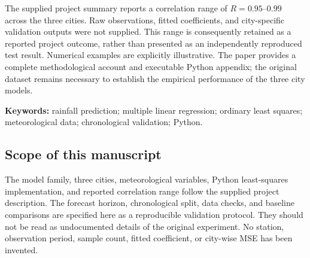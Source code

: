 \documentclass[11pt,a4paper]{article}
\begin{document}
The supplied project summary reports a correlation range of $R=0.95$--$0.99$ across the three cities. Raw observations, fitted coefficients, and city-specific validation outputs were not supplied. This range is consequently retained as a reported project outcome, rather than presented as an independently reproduced test result. Numerical examples are explicitly illustrative. The paper provides a complete methodological account and executable Python appendix; the original dataset remains necessary to establish the empirical performance of the three city models.

\textbf{Keywords:} rainfall prediction; multiple linear regression; ordinary least squares; meteorological data; chronological validation; Python.

\vspace{5mm}
\subsection*{Scope of this manuscript}
The model family, three cities, meteorological variables, Python least-squares implementation, and reported correlation range follow the supplied project description. The forecast horizon, chronological split, data checks, and baseline comparisons are specified here as a reproducible validation protocol. They should not be read as undocumented details of the original experiment. No station, observation period, sample count, fitted coefficient, or city-wise MSE has been invented.

\clearpage
\tableofcontents

\clearpage
\end{document}
